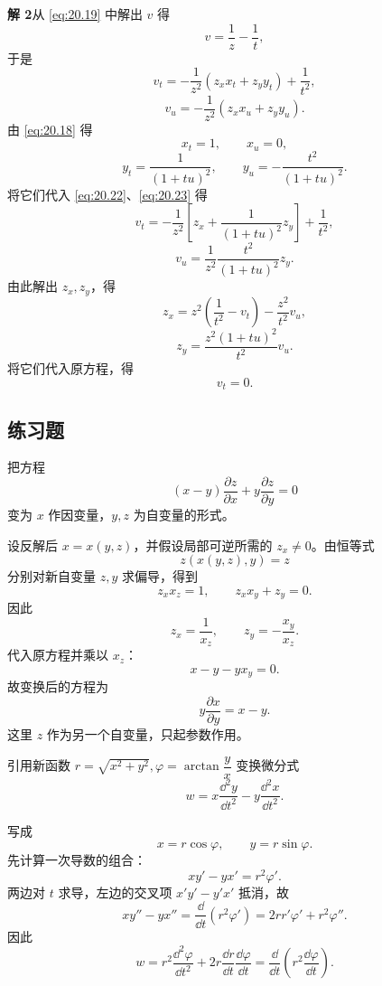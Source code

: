 \begin{xsolution}
\textbf{解 2}\quad 从 \eqref{eq:20.19} 中解出 $v$ 得
\[
  v=\frac1z-\frac1t,
\]
于是
\begin{equation}
  v_t=-\frac1{z^2}(z_xx_t+z_yy_t)+\frac1{t^2},
  \tag{20.22}
  \label{eq:20.22}
\end{equation}
\begin{equation}
  v_u=-\frac1{z^2}(z_xx_u+z_yy_u).
  \tag{20.23}
  \label{eq:20.23}
\end{equation}
由 \eqref{eq:20.18} 得
\[
  x_t=1,\qquad x_u=0,
\]
\[
  y_t=\frac1{(1+tu)^2},\qquad
  y_u=-\frac{t^2}{(1+tu)^2}.
\]
将它们代入 \eqref{eq:20.22}、\eqref{eq:20.23} 得
\[
  v_t=-\frac1{z^2}\left[z_x+\frac1{(1+tu)^2}z_y\right]+\frac1{t^2},
\]
\[
  v_u=\frac1{z^2}\frac{t^2}{(1+tu)^2}z_y.
\]
由此解出 $z_x,z_y$，得
\[
  z_x=z^2\left(\frac1{t^2}-v_t\right)-\frac{z^2}{t^2}v_u,
\]
\[
  z_y=\frac{z^2(1+tu)^2}{t^2}v_u.
\]
将它们代入原方程，得
\[
  v_t=0.
\]
\end{xsolution}

\subsection{练习题}

\begin{xexercise}[1]
把方程
  \[
    (x-y)\frac{\partial z}{\partial x}+y\frac{\partial z}{\partial y}=0
  \]
  变为 $x$ 作因变量，$y,z$ 为自变量的形式。
\end{xexercise}
\begin{xsolution}
设反解后 $x=x(y,z)$，并假设局部可逆所需的 $z_x\ne0$。由恒等式
\[
  z(x(y,z),y)=z
\]
分别对新自变量 $z,y$ 求偏导，得到
\[
  z_xx_z=1,
  \qquad
  z_xx_y+z_y=0.
\]
因此
\[
  z_x=\frac1{x_z},
  \qquad
  z_y=-\frac{x_y}{x_z}.
\]
代入原方程并乘以 $x_z$：
\[
  x-y-yx_y=0.
\]
故变换后的方程为
\[
  \boxed{\displaystyle y\frac{\partial x}{\partial y}=x-y}.
\]
这里 $z$ 作为另一个自变量，只起参数作用。
\end{xsolution}


\begin{xexercise}[2]
引用新函数 $r=\sqrt{x^2+y^2},\varphi=\arctan\dfrac yx$ 变换微分式
  \[
    w=x\frac{\dd^2y}{\dd t^2}-y\frac{\dd^2x}{\dd t^2}.
  \]
\end{xexercise}
\begin{xsolution}
写成
\[
  x=r\cos\varphi,
  \qquad
  y=r\sin\varphi.
\]
先计算一次导数的组合：
\[
  xy'-yx'
  =r^2\varphi'.
\]
两边对 $t$ 求导，左边的交叉项 $x'y'-y'x'$ 抵消，故
\[
  xy''-yx''=\frac{\dd}{\dd t}(r^2\varphi')
  =2rr'\varphi'+r^2\varphi''.
\]
因此
\[
  \boxed{\displaystyle
    w=r^2\frac{\dd^2\varphi}{\dd t^2}
      +2r\frac{\dd r}{\dd t}\frac{\dd\varphi}{\dd t}}
  =\boxed{\displaystyle
    \frac{\dd}{\dd t}\left(r^2\frac{\dd\varphi}{\dd t}\right)}.
\]
\end{xsolution}


